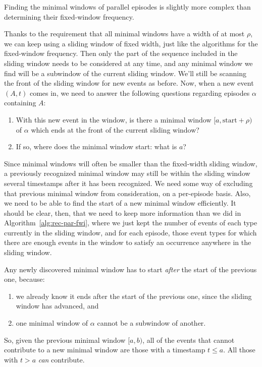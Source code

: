 Finding the minimal windows of parallel episodes is slightly more complex than determining their fixed-window frequency.

Thanks to the requirement that all minimal windows have a width of at most $ \rho $, we can keep using a sliding window of fixed width, just like the algorithms for the fixed-window frequency. Then only the part of the sequence included in the sliding window needs to be considered at any time, and any minimal window we find will be a subwindow of the current sliding window. We'll still be scanning the front of the sliding window for new events as before. Now, when a new event $ (A, t) $ comes in, we need to answer the following questions regarding episodes $ \alpha $ containing $ A $:
\begin{enumerate}
\item With this new event in the window, is there a minimal window $ [a, \text{start} + \rho) $ of $ \alpha $ which ends at the front of the current sliding window?
\item If so, where does the minimal window start: what is $ a $?
\end{enumerate}

Since minimal windows will often be smaller than the fixed-width sliding window, a previously recognized minimal window may still be within the sliding window several timestamps after it has been recognized. We need some way of excluding that previous minimal window from consideration, on a per-episode basis. Also, we need to be able to find the start of a new minimal window efficiently. It should be clear, then, that we need to keep more information than we did in Algorithm~\ref{alg:rec-par-fwi}, where we just kept the number of events of each type currently in the sliding window, and for each episode, those event types for which there are enough events in the window to satisfy an occurrence anywhere in the sliding window.

Any newly discovered minimal window has to start \emph{after} the start of the previous one, because:
\begin{enumerate}
\item we already know it ends after the start of the previous one, since the sliding window has advanced, and
\item one minimal window of $ \alpha $ cannot be a subwindow of another.
\end{enumerate}

So, given the previous minimal window $ [a, b) $, all of the events that cannot contribute to a new minimal window are those with a timestamp $ t \leq a $. All those with $ t > a $ \emph{can} contribute.

